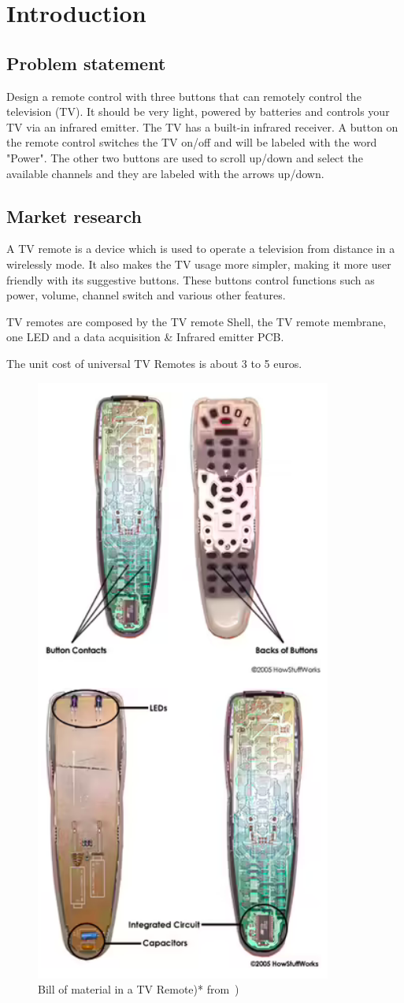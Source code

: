 %
%
%
\chapter{Introduction}%
\label{ch:introduction}

\section{Problem statement}
\label{sec:prob-stat}
    Design a remote control with three buttons that can
remotely control the television (TV). It should be very
light, powered by batteries and controls your TV via an
infrared emitter. The TV has a built-in infrared receiver. A
button on the remote control switches the TV on/off and
will be labeled with the word "Power". The other two
buttons are used to scroll up/down and select the available
channels and they are labeled with the arrows up/down.

\section{Market research}
\label{sec:market-research}
	A TV remote is a device which is used to operate a television from distance in a wirelessly mode. It also makes the TV usage more simpler, making it more user friendly with its suggestive buttons. These buttons control functions such as power, volume, channel switch and various other features.

TV remotes are composed by the TV remote Shell,
the TV remote membrane, one LED and a data acquisition \& Infrared emitter PCB.

The unit cost of universal TV Remotes is about 3 to 5 euros.

\begin{figure}
\centering
    \includegraphics[width=0.3\columnwidth]{./img/remotematerial.png}
  \caption{Bill of material in a TV Remote)* from~\cite{remotematerial})}%
\label{fig:remotemat}
\end{figure}


